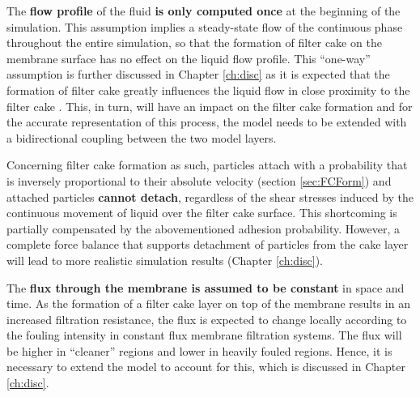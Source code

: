 The \textbf{flow profile} of the fluid \textbf{is only computed once} at the beginning of the simulation. This assumption implies a steady-state flow of the continuous phase throughout the entire simulation, so that the formation of filter cake on the membrane surface has no effect on the liquid flow profile. This ``one-way'' assumption is further discussed in Chapter \ref{ch:disc} as it is expected that the formation of filter cake greatly influences the liquid flow in close proximity to the filter cake \citep{Picioreanu2009}. This, in turn, will have an impact on the filter cake formation and for the accurate representation of this process, the model needs to be extended with a bidirectional coupling between the two model layers. \par
Concerning filter cake formation as such, particles attach with a probability that is inversely proportional to their absolute velocity (section \ref{sec:FCForm}) and attached particles \textbf{cannot detach}, regardless of the shear stresses induced by the continuous movement of liquid over the filter cake surface. This shortcoming is partially compensated by the abovementioned adhesion probability. However, a complete force balance that supports detachment of particles from the cake layer will lead to more realistic simulation results (Chapter \ref{ch:disc}). \par
The \textbf{flux through the membrane is assumed to be constant} in space and time. As the formation of a filter cake layer on top of the membrane results in an increased filtration resistance, the flux is expected to change locally according to the fouling intensity in constant flux membrane filtration systems. The flux will be higher in ``cleaner'' regions and lower in heavily fouled regions. Hence, it is necessary to extend the model to account for this, which is discussed in Chapter \ref{ch:disc}. %

